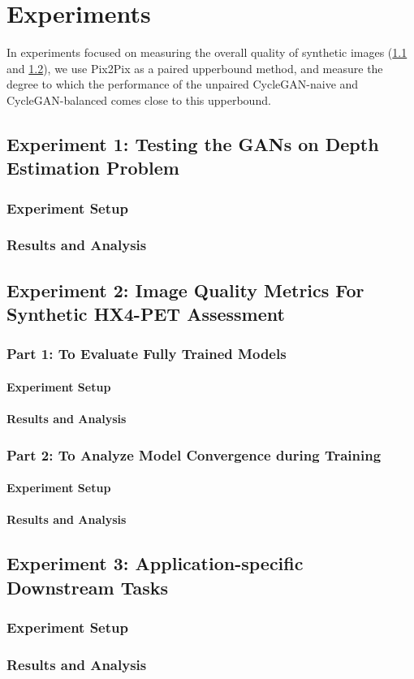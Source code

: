 \chapter{Experiments}
\label{Experiments}
In experiments focused on measuring the overall quality of synthetic images (\ref{Expt_1} and \ref{Expt_2}), we use Pix2Pix as a paired upperbound method, and measure the degree to which the performance of the unpaired CycleGAN-naive and CycleGAN-balanced comes close to this upperbound.

\section{Experiment 1: Testing the GANs on Depth Estimation Problem}
\label{Expt_1}
\subsection{Experiment Setup}
\subsection{Results and Analysis}


 
\section{Experiment 2: Image Quality Metrics For Synthetic HX4-PET Assessment}
\label{Expt_2}
\subsection{Part 1: To Evaluate Fully Trained Models}
\subsubsection{Experiment Setup}
\subsubsection{Results and Analysis}

\subsection{Part 2: To Analyze Model Convergence during Training}
\subsubsection{Experiment Setup}
\subsubsection{Results and Analysis}



\section{Experiment 3: Application-specific Downstream Tasks}
\label{Expt_3}
\subsection{Experiment Setup}
\subsection{Results and Analysis}
